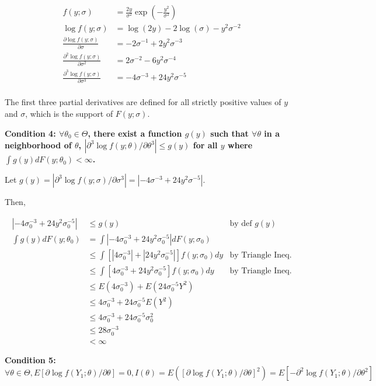 \documentclass[
  letterpaper,
  DIV=11,
  numbers=noendperiod]{scrreprt}
\begin{document}
\[\begin{aligned}
f(y;\sigma) &= \frac{2y}{\sigma^2}\exp\left(-\frac {y^2}{\sigma^2}\right) \\
\log f(y;\sigma) &= \log (2y)- 2\log(\sigma)  -y^2\sigma^{-2}  \\
\frac{\partial \log f(y;\sigma)}{\partial \sigma} &= - 2 \sigma^{-1} +2y^2\sigma^{-3} \\
\frac{\partial^2 \log f(y;\sigma)}{\partial \sigma^2} &= 2 \sigma^{-2} -6y^2\sigma^{-4} \\
\frac{\partial^3 \log f(y;\sigma)}{\partial \sigma^3} &= -4 \sigma^{-3} +24y^2\sigma^{-5} \\
\end{aligned}
\]

The first three partial derivatives are defined for all strictly
positive values of \(y\) and \(\sigma\), which is the support of
\(F(y;\sigma)\).

\textbf{Condition 4: \(\forall \theta_0 \in \Theta\), there exist a
function \(g(y)\) such that \(\forall \theta\) in a neighborhood of
\(\theta\),
\(|\partial^3 \log f(y;\theta)/\partial \theta^3| \leq g(y)\) for all
\(y\) where \(\int g(y)dF(y;\theta_0) < \infty\).}

Let
\(g(y)= |\partial^3 \log f(y;\sigma)/\partial \sigma^3| = |-4 \sigma^{-3} +24y^2\sigma^{-5}|\).

Then,

\[\begin{aligned}
|-4 \sigma_0^{-3} +24y^2\sigma_0^{-5}| &\leq g(y) & \text{by def } g(y) \\ 
\int g(y)dF(y;\theta_0) &= \int |-4 \sigma_0^{-3} +24y^2\sigma_0^{-5}|dF(y; \sigma_0) \\
&\leq \int [|4 \sigma_0^{-3}| +|24y^2\sigma_0^{-5}|]f(y;\sigma_0)dy & \text{by Triangle Ineq.} \\
&\leq \int [4 \sigma_0^{-3} +24y^2\sigma_0^{-5}]f(y;\sigma_0)dy & \text{by Triangle Ineq.} \\
&\leq E(4 \sigma_0^{-3}) + E(24\sigma_0^{-5}Y^2) \\
&\leq 4 \sigma_0^{-3} + 24\sigma_0^{-5}E(Y^2)\\
&\leq 4 \sigma_0^{-3} + 24\sigma_0^{-5}\sigma_0^2 \\
&\leq 28\sigma_0^{-3} \\
&< \infty
\end{aligned}\]

\textbf{Condition 5:
\(\forall \theta \in \Theta, E[\partial \log f(Y_1;\theta)/\partial \theta] = 0, I(\theta)=E([\partial \log f(Y_1;\theta)/\partial \theta]^2) = E[-\partial^2 \log f(Y_1;\theta)/\partial \theta^2]\)}
\end{document}
